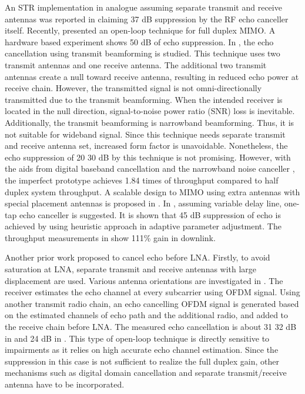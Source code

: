 \documentclass[twocolumn]{IEEEtran}
\begin{document}
An STR implementation in analogue assuming separate transmit and
receive antennas was reported in \cite{str1998} claiming 37 dB
suppression by the RF echo canceller itself. Recently,
\cite{str2012} presented an open-loop technique for full duplex
MIMO. A hardware based experiment shows 50 dB of echo suppression.
In \cite{stanford}, the echo cancellation using transmit beamforming
is studied. This technique uses two transmit antennas and one
receive antenna. The additional two transmit antennas create a null
toward receive antenna, resulting in reduced echo power at receive
chain. However, the transmitted signal is not omni-directionally
transmitted due to the transmit beamforming. When the intended
receiver is located in the null direction, signal-to-noise power
ratio (SNR) loss is inevitable. Additionally, the transmit
beamforming is narrowband beamforming. Thus, it is not suitable for
wideband signal. Since this technique needs separate transmit and
receive antenna set, increased form factor is unavoidable.
Nonetheless, the echo suppression of 20  30 dB by this
technique is not promising. However, with the aids from digital
baseband cancellation and the narrowband noise canceller
\cite{narrow}, the imperfect prototype achieves 1.84 times of
throughput compared to half duplex system throughput. A scalable
design to MIMO using extra antennas with special placement antennas
is proposed in \cite{midu}. In \cite{mac2}, assuming variable delay
line, one-tap echo canceller is suggested. It is shown that 45 dB
suppression of echo is achieved by using heuristic approach in
adaptive parameter adjustment. The throughput measurements in
\cite{mac2} show 111\% gain in downlink.

Another prior work \cite{rice1} proposed to cancel echo before LNA.
Firstly, to avoid saturation at LNA, separate transmit and receive
antennas with large displacement are used. Various antenna
orientations are investigated in \cite{rice2}. The receiver
estimates the echo channel at every subcarrier using OFDM signal.
Using another transmit radio chain, an echo cancelling OFDM signal
is generated based on the estimated channels of echo path and the
additional radio, and added to the receive chain before LNA. The
measured echo cancellation is about 31  32 dB in \cite{rice1}
and 24 dB in \cite{rice2}. This type of open-loop technique is
directly sensitive to impairments as it relies on high accurate echo
channel estimation. Since the suppression in this case is not
sufficient to realize the full duplex gain, other mechanisms such as
digital domain cancellation and separate transmit/receive antenna
have to be incorporated.
\end{document}
